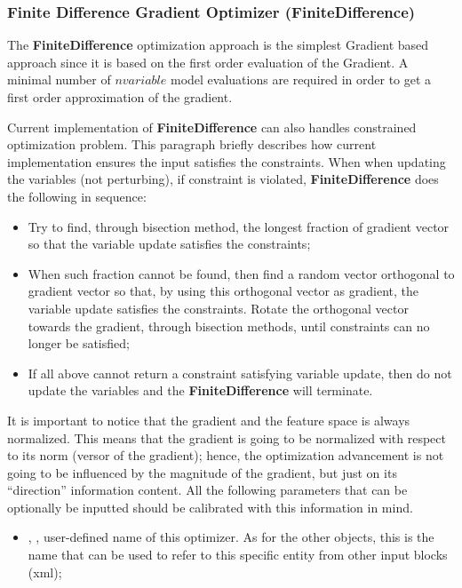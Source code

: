 \subsubsection{Finite Difference Gradient Optimizer (FiniteDifference)}
\label{subsubsubsec:FiniteDifference}
The \textbf{FiniteDifference} optimization approach is  the simplest Gradient based approach since it is based on the
first order evaluation of the Gradient.  A minimal number of $n variable$
model evaluations are required in order to get a first order approximation of the gradient.

Current implementation of \textbf{FiniteDifference} can also handles
constrained optimization problem. This paragraph briefly describes how current implementation ensures the input satisfies the
constraints. When when updating the variables (not perturbing), if constraint is violated, \textbf{FiniteDifference} does the following in
sequence:
\begin{itemize}
\item Try to find, through bisection method, the longest fraction of gradient vector so that the variable update satisfies the
constraints;
\item When such fraction cannot be found, then find a random vector orthogonal to gradient vector so that, by using this
orthogonal vector as gradient, the variable update satisfies the constraints. Rotate the orthogonal vector towards the gradient,
through bisection methods, until constraints can no longer be satisfied;
\item If all above cannot return a constraint satisfying variable update, then do not update the variables and the \textbf{FiniteDifference} will
terminate.
\end{itemize}

It is important to notice that the gradient and the feature space is always normalized. This means that the gradient is going to be
normalized with respect to its norm (versor of the gradient); hence, the optimization advancement is not going to be influenced by the
magnitude of the gradient, but just on its ``direction'' information content. All the following parameters that can be optionally be inputted
should be calibrated with this information in mind.
%

%
\attrsIntro
\vspace{-5mm}
\begin{itemize}
\itemsep0em
\item {}, , user-defined name of this optimizer. \nb As for the other objects, this is
the name that can be used to refer to this specific entity from other input blocks (xml);
\end{itemize}
\vspace{-5mm}

